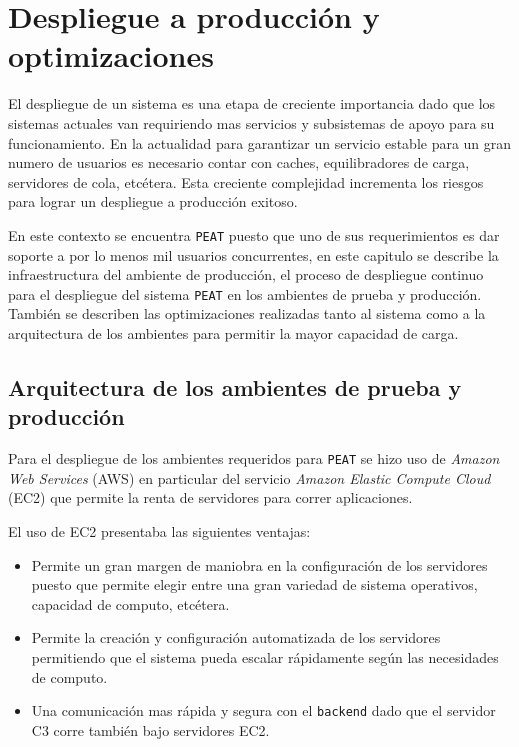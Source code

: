 \chapter{Despliegue a producción y optimizaciones}

El despliegue de un sistema es una etapa de creciente importancia dado que los
sistemas actuales van requiriendo mas servicios y subsistemas de apoyo para
su funcionamiento. En la actualidad para garantizar un servicio estable para
un gran numero de usuarios es necesario contar con caches, equilibradores de
carga, servidores de cola, etcétera. Esta creciente complejidad incrementa los
riesgos para lograr un despliegue a producción exitoso.

En este contexto se encuentra \texttt{PEAT} puesto que uno de sus requerimientos
es dar soporte a por lo menos mil usuarios concurrentes, en este capitulo se
describe la infraestructura del ambiente de producción, el proceso de despliegue
continuo para el despliegue del sistema \texttt{PEAT} en los ambientes de prueba
y producción. También se describen las optimizaciones realizadas tanto al
sistema como a la arquitectura de los ambientes para permitir la mayor capacidad
de carga.

\section{Arquitectura de los ambientes de prueba y producción}

Para el despliegue de los ambientes requeridos para \texttt{PEAT} se hizo uso de
\textit{Amazon Web Services} (AWS) en particular del servicio
\textit{Amazon Elastic Compute Cloud} (EC2) que permite la renta de servidores
para correr aplicaciones.

El uso de EC2 presentaba las siguientes ventajas:
\begin{itemize}
\item Permite un gran margen de maniobra en la configuración de los servidores
  puesto que permite elegir entre una gran variedad de sistema operativos,
  capacidad de computo, etcétera.
\item Permite la creación y configuración automatizada de los servidores
  permitiendo que el sistema pueda escalar rápidamente según las necesidades
  de computo.
\item Una comunicación mas rápida y segura con el \texttt{backend} dado que el
  servidor C3 corre también bajo servidores EC2.
\end{itemize}

